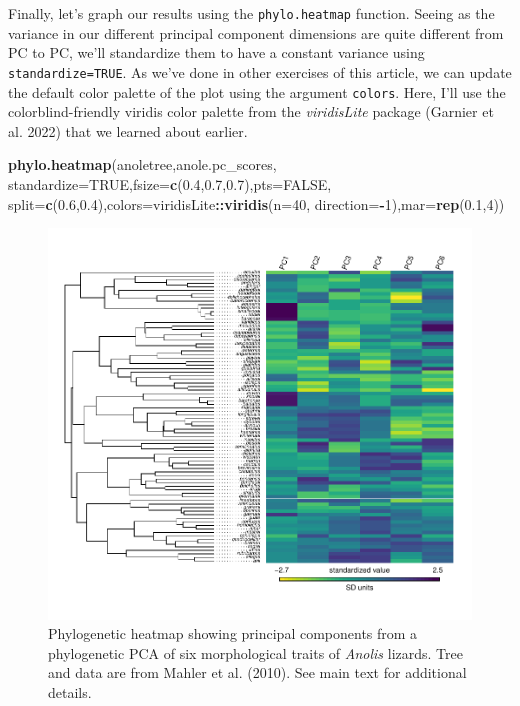 \documentclass[fleqn,10pt,lineno]{wlpeerj} %
\newenvironment{Shaded}{\begin{snugshade}}{\end{snugshade}}
\newcommand{\AttributeTok}[1]{\textcolor[rgb]{0.13,0.29,0.53}{#1}}
\newcommand{\ConstantTok}[1]{\textcolor[rgb]{0.56,0.35,0.01}{#1}}
\newcommand{\DecValTok}[1]{\textcolor[rgb]{0.00,0.00,0.81}{#1}}
\newcommand{\FloatTok}[1]{\textcolor[rgb]{0.00,0.00,0.81}{#1}}
\newcommand{\FunctionTok}[1]{\textcolor[rgb]{0.13,0.29,0.53}{\textbf{#1}}}
\newcommand{\NormalTok}[1]{#1}
\newcommand{\SpecialCharTok}[1]{\textcolor[rgb]{0.81,0.36,0.00}{\textbf{#1}}}
\begin{document}
Finally, let's graph our results using the \texttt{phylo.heatmap} function. Seeing as the variance in our different principal component dimensions are quite different from PC to PC, we'll standardize them to have a constant variance using \texttt{standardize=TRUE}. As we've done in other exercises of this article, we can update the default color palette of the plot using the argument \texttt{colors}. Here, I'll use the colorblind-friendly viridis color palette from the \emph{viridisLite} package (Garnier et al. 2022) that we learned about earlier.

\begin{Shaded}
\begin{Highlighting}[]
\FunctionTok{phylo.heatmap}\NormalTok{(anoletree,anole.pc\_scores,}
  \AttributeTok{standardize=}\ConstantTok{TRUE}\NormalTok{,}\AttributeTok{fsize=}\FunctionTok{c}\NormalTok{(}\FloatTok{0.4}\NormalTok{,}\FloatTok{0.7}\NormalTok{,}\FloatTok{0.7}\NormalTok{),}\AttributeTok{pts=}\ConstantTok{FALSE}\NormalTok{,}
  \AttributeTok{split=}\FunctionTok{c}\NormalTok{(}\FloatTok{0.6}\NormalTok{,}\FloatTok{0.4}\NormalTok{),}\AttributeTok{colors=}\NormalTok{viridisLite}\SpecialCharTok{::}\FunctionTok{viridis}\NormalTok{(}\AttributeTok{n=}\DecValTok{40}\NormalTok{,}
  \AttributeTok{direction=}\SpecialCharTok{{-}}\DecValTok{1}\NormalTok{),}\AttributeTok{mar=}\FunctionTok{rep}\NormalTok{(}\FloatTok{0.1}\NormalTok{,}\DecValTok{4}\NormalTok{))}
\end{Highlighting}
\end{Shaded}

\begin{figure}
\includegraphics[width=1\linewidth]{Revell.phytools-v2_peerj_files/figure-latex/anole-heatmap-1} \caption{Phylogenetic heatmap showing principal components from a phylogenetic PCA of six morphological traits of \textit{Anolis} lizards. Tree and data are from Mahler et al. (2010). See main text for additional details.}\label{fig:anole-heatmap}
\end{figure}
\end{document}
